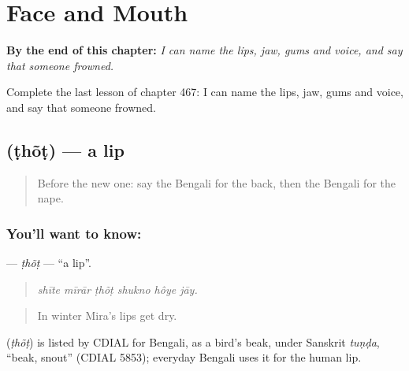 
\chapter{Face and Mouth}
\label{ch:bn-face-and-mouth}

\begin{chapteropening}
\textbf{By the end of this chapter:} \emph{I can name the lips, jaw, gums and voice, and say that someone frowned.}

Complete the last lesson of chapter 467: I can name the lips, jaw, gums and voice, and say that someone frowned.
\end{chapteropening}

\section[\texorpdfstring{\bn{ঠোঁট} (ṭhõṭ)}{ঠোঁট (ṭhõṭ)}]{ (ṭhõṭ) — a lip}

\label{lesson:BN-C467-thot}



\begin{quote}
Before the new one: say the Bengali for the back, then the Bengali for the nape.
\end{quote}

\subsection*{You'll want to know: }
\textbf{} — \emph{ṭhõṭ} — \textquotedblleft{}a lip\textquotedblright{}.

\begin{quote}
     
\end{quote}

\begin{quote}
\emph{shīte mīrār ṭhõṭ shukno hôye jāy.}
\end{quote}

\begin{quote}
In winter Mira's lips get dry.
\end{quote}

\begin{cousinweb}
\textbf{} (\emph{ṭhõṭ}) is listed by CDIAL for Bengali, as a bird's beak, under Sanskrit \emph{tuṇḍa}, \textquotedblleft{}beak, snout\textquotedblright{} (CDIAL 5853); everyday Bengali uses it for the human lip.
\end{cousinweb}

